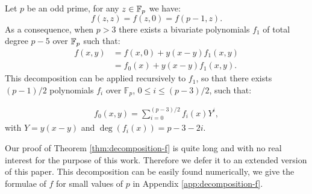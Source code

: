   \begin{theorem}\label{thm:decomposition-f}
    Let $p$ be an odd prime, for any $z\in\mathbb{F}_p$ we have:
    \begin{equation}
      \label{eq:3}
       f(z,z) = f(z,0) = f(p-1,z).
    \end{equation}
    As a consequence, when $p>3$ there exists a bivariate polynomials $f_1$ of total degree $p-5$ over $\mathbb{F}_p$ such that:
    \begin{align}
      \label{eq:dec-f}
      f(x,y) &= f(x,0) + y(x-y)f_1(x,y) \\
      &= f_0(x) + y(x-y)f_1(x,y).
    \end{align}   
    This decomposition can be applied recursively to $f_1$, so that there exists $(p-1)/2$ polynomials $f_i$ over $\mathbb{F}_p$, $0\leq i \leq (p-3)/2$, such that:

    \begin{align}\label{eq:decomposition-f-final}
      f_0(x,y) = \sum_{i=0}^{(p-3)/2} f_i(x)Y^i,
    \end{align}
    with $Y=y(x-y)$ and $\deg (f_{i}(x)) = p-3 - 2i$.

  \end{theorem}  

  Our proof of Theorem \ref{thm:decomposition-f} is quite long and with no real interest for the purpose of this work. Therefore we defer it to an extended version of this paper. This decomposition can be easily found numerically, we give the formulae of $f$ for small values of $p$ in Appendix \ref{app:decomposition-f}.\newline
  



    

